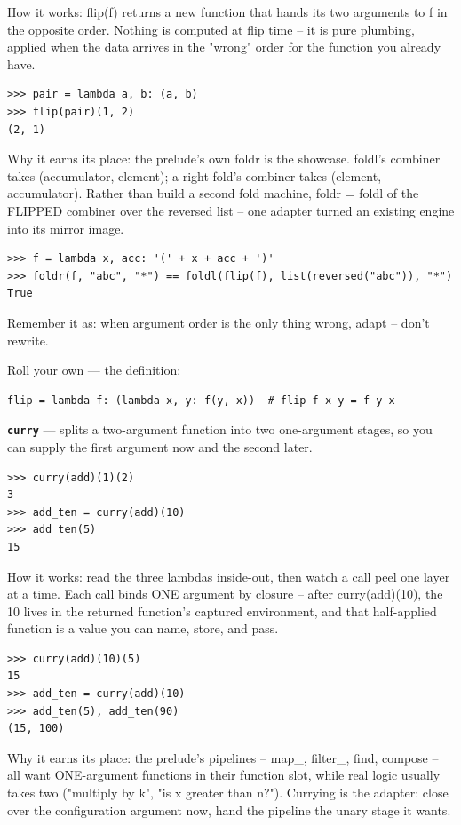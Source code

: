 \documentclass[10pt,letterpaper]{article}
\begin{document}
How it works: flip(f) returns a new function that hands its two arguments to f in the opposite order. Nothing is computed at flip time -- it is pure plumbing, applied when the data arrives in the "wrong" order for the function you already have.

\begin{lstlisting}[style=ex]
>>> pair = lambda a, b: (a, b)
>>> flip(pair)(1, 2)
(2, 1)
\end{lstlisting}

Why it earns its place: the prelude's own foldr is the showcase. foldl's combiner takes (accumulator, element); a right fold's combiner takes (element, accumulator). Rather than build a second fold machine, foldr = foldl of the FLIPPED combiner over the reversed list -- one adapter turned an existing engine into its mirror image.

\begin{lstlisting}[style=ex]
>>> f = lambda x, acc: '(' + x + acc + ')'
>>> foldr(f, "abc", "*") == foldl(flip(f), list(reversed("abc")), "*")
True
\end{lstlisting}

Remember it as: when argument order is the only thing wrong, adapt -- don't rewrite.


Roll your own --- the definition:

\begin{lstlisting}[style=ex]
flip = lambda f: (lambda x, y: f(y, x))  # flip f x y = f y x
\end{lstlisting}
\textbf{\texttt{curry}} --- splits a two-argument function into two one-argument stages, so you can supply the first argument now and the second later.
\begin{lstlisting}[style=ex]
>>> curry(add)(1)(2)
3
>>> add_ten = curry(add)(10)
>>> add_ten(5)
15
\end{lstlisting}

How it works: read the three lambdas inside-out, then watch a call peel one layer at a time. Each call binds ONE argument by closure -- after curry(add)(10), the 10 lives in the returned function's captured environment, and that half-applied function is a value you can name, store, and pass.

\begin{lstlisting}[style=ex]
>>> curry(add)(10)(5)
15
>>> add_ten = curry(add)(10)
>>> add_ten(5), add_ten(90)
(15, 100)
\end{lstlisting}

Why it earns its place: the prelude's pipelines -- map\_, filter\_, find, compose -- all want ONE-argument functions in their function slot, while real logic usually takes two ("multiply by k", "is x greater than n?"). Currying is the adapter: close over the configuration argument now, hand the pipeline the unary stage it wants.
\end{document}
